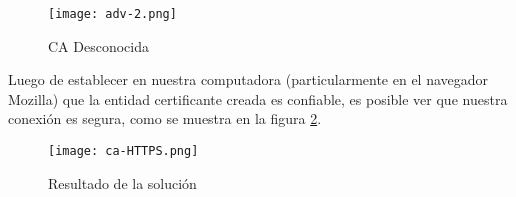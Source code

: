 \begin{center}
    \begin{figure}   
       \begin{center}
          \texttt{[image: adv-2.png]}
       \end{center}
       \caption{CA Desconocida}
       \label{figCAdesc}
    \end{figure}
 \end{center}

Luego de establecer en nuestra computadora (particularmente en el navegador Mozilla) que la 
entidad certificante creada es confiable, es posible ver que nuestra conexión es segura, como 
se muestra en la figura \ref{resulCA}.

\begin{center}
    \begin{figure}   
       \begin{center}
          \texttt{[image: ca-HTTPS.png]}
       \end{center}
       \caption{Resultado de la solución}
       \label{resulCA}
    \end{figure}
 \end{center}





